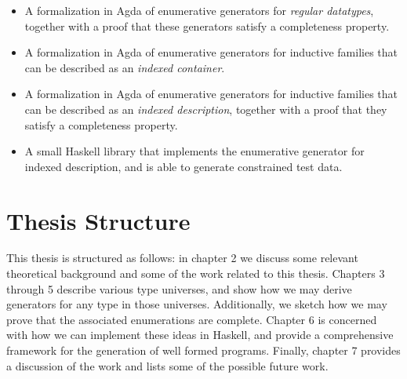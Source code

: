 \documentclass[a4paper,msc,twosized=semi]{uustthesis}
\begin{document}
  \begin{itemize}
    \item 
      A formalization in Agda of enumerative generators for \emph{regular datatypes}, together with a proof that these generators satisfy a completeness property. 

    \item 
      A formalization in Agda of enumerative generators for inductive families that can be described as an \emph{indexed container}. 

    \item 
      A formalization in Agda of enumerative generators for inductive families that can be described as an \emph{indexed description}, together with a proof that they satisfy a completeness property. 

    \item 
      A small Haskell library that implements the enumerative generator for indexed description, and is able to generate constrained test data. 
  \end{itemize}

\section{Thesis Structure}

  This thesis is structured as follows: in chapter 2 we discuss some relevant 
  theoretical background and some of the work related to 
  this thesis. Chapters 3 through 5 describe various type universes, and show how we may derive 
  generators for any type in those universes. Additionally, we sketch how we may prove 
  that the associated enumerations are complete. Chapter 6 is concerned with 
  how we can implement these ideas in Haskell, and provide a comprehensive framework 
  for the generation of well formed programs. Finally, chapter 7 provides a discussion 
  of the work and lists some of the possible future work.



\end{document}
